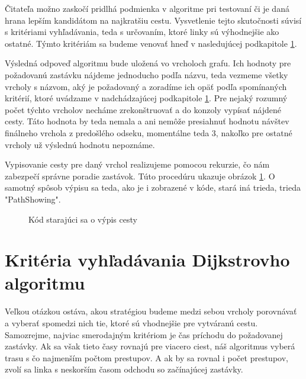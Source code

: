 Čitateľa možno zaskočí pridlhá podmienka v algoritme pri testovaní či je daná hrana lepším kandidátom na najkratšiu cestu. Vysvetlenie tejto skutočnosti súvisí s kritériami vyhľadávania, teda s určovaním, ktoré linky sú výhodnejšie ako ostatné. Týmto kritériám sa budeme venovať hneď v nasledujúcej podkapitole \ref{sec:kriteria}.\newline

Výsledná odpoveď algoritmu bude uložená vo vrcholoch grafu. Ich hodnoty pre požadovanú zastávku nájdeme jednoducho podľa názvu, teda vezmeme všetky vrcholy s názvom, aký je požadovaný a zoradíme ich opäť podľa spomínaných kritérií, ktoré uvádzame v nadchádzajúcej podkapitole \ref{sec:kriteria}. Pre nejaký rozumný počet týchto vrcholov necháme zrekonštruovať a do konzoly vypísať nájdené cesty. Táto hodnota by teda nemala a ani nemôže presiahnuť hodnotu návštev finálneho vrchola z predošlého odseku, momentálne teda $3$, nakoľko pre ostatné vrcholy už výslednú hodnotu nepoznáme.\newline

Vypisovanie cesty pre daný vrchol realizujeme pomocou rekurzie, čo nám zabezpečí správne poradie zastávok. Túto procedúru ukazuje obrázok \ref{PathShowing}. O samotný spôsob výpisu sa teda, ako je i zobrazené v kóde, stará iná trieda, trieda "PathShowing".\newline

\begin{figure}[H]
  \caption{Kód starajúci sa o výpis cesty}
  \label{PathShowing}
\end{figure}


\section{Kritéria vyhľadávania Dijkstrovho algoritmu}
\label{sec:kriteria}

Veľkou otázkou ostáva, akou stratégiou budeme medzi sebou vrcholy porovnávať a vyberať spomedzi nich tie, ktoré sú vhodnejšie pre vytváranú cestu. Samozrejme, najviac smerodajným kritériom je čas príchodu do požadovanej zastávky. Ak sa však tieto časy rovnajú pre viacero ciest, náš algoritmus vyberá trasu s čo najmenším počtom prestupov. A ak by sa rovnal i počet prestupov, zvolí sa linka s neskorším časom odchodu so začínajúcej zastávky.\newline

